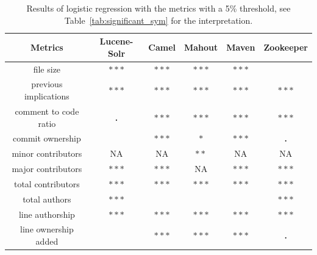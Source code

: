 \begin{table}[ht]
\centering
\caption{Results of logistic regression with the metrics with a 5\% threshold, see Table~\ref{tab:significant_sym} for the interpretation.}
\label{tab:logistic_regression5}
\begin{tabular}{|c|c|c|c|c|c|}
\hline
\textbf{Metrics}                 & \textbf{Lucene-Solr} & \textbf{Camel} & \textbf{Mahout} & \textbf{Maven}  & \textbf{Zookeeper} \\ \hline
file size                        & \textbf{$\ast\ast\ast$}         & \textbf{$\ast\ast\ast$}   & \textbf{$\ast\ast\ast$}    & \textbf{$\ast\ast\ast$}    &                    \\
previous implications            & \textbf{$\ast\ast\ast$}         & \textbf{$\ast\ast\ast$}   & \textbf{$\ast\ast\ast$}    & \textbf{$\ast\ast\ast$}    & \textbf{$\ast\ast\ast$}       \\
comment to code ratio            & \textbf{.}           & \textbf{$\ast\ast\ast$}   & \textbf{$\ast\ast\ast$}    & \textbf{$\ast\ast\ast$}    & \textbf{$\ast\ast\ast$}       \\
\hline
commit ownership                 &                      & \textbf{$\ast\ast\ast$}   & \textbf{$\ast$}      & \textbf{$\ast\ast\ast$}    & \textbf{.}         \\
minor contributors               & NA                   & NA             & \textbf{$\ast\ast$}     & NA              & NA                 \\
major contributors               & \textbf{$\ast\ast\ast$}         & \textbf{$\ast\ast\ast$}   & NA              & \textbf{$\ast\ast\ast$}    & \textbf{$\ast\ast\ast$}       \\ 
total contributors & \textbf{$\ast\ast\ast$} & \textbf{$\ast\ast\ast$} & \textbf{$\ast\ast\ast$} & \textbf{$\ast\ast\ast$} & \textbf{$\ast\ast\ast$} \\\hline
total authors                    & \textbf{$\ast\ast\ast$}         & \textbf{}      & \textbf{}       & \textbf{}       & \textbf{$\ast\ast\ast$}       \\
line authorship                  & \textbf{$\ast\ast\ast$}         & \textbf{$\ast\ast\ast$}   & \textbf{$\ast\ast\ast$}    & \textbf{$\ast\ast\ast$}    & \textbf{$\ast\ast\ast$}       \\ \hline
line ownership added             & \textbf{}            & \textbf{$\ast\ast\ast$}   & \textbf{$\ast\ast\ast$}    & \textbf{$\ast\ast\ast$}    & \textbf{.}         \\

\end{tabular}
\end{table}
